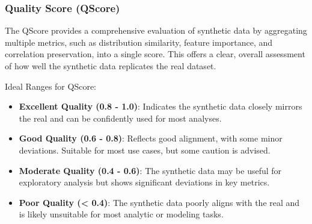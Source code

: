 \documentclass[
  letterpaper,
  DIV=11,
  numbers=noendperiod]{scrartcl}
\providecommand{\tightlist}{%
  \setlength{\itemsep}{0pt}\setlength{\parskip}{0pt}}\usepackage{longtable,booktabs,array}
\begin{document}
\subsubsection{Quality Score (QScore)}\label{quality-score-qscore}

The QScore provides a comprehensive evaluation of synthetic data by
aggregating multiple metrics, such as distribution similarity, feature
importance, and correlation preservation, into a single score. This
offers a clear, overall assessment of how well the synthetic data
replicates the real dataset.

Ideal Ranges for QScore:

\begin{itemize}
\tightlist
\item
  \textbf{Excellent Quality (0.8 - 1.0)}: Indicates the synthetic data
  closely mirrors the real and can be confidently used for most
  analyses.
\item
  \textbf{Good Quality (0.6 - 0.8)}: Reflects good alignment, with some
  minor deviations. Suitable for most use cases, but some caution is
  advised.
\item
  \textbf{Moderate Quality (0.4 - 0.6)}: The synthetic data may be
  useful for exploratory analysis but shows significant deviations in
  key metrics.
\item
  \textbf{Poor Quality (\textless{} 0.4)}: The synthetic data poorly
  aligns with the real and is likely unsuitable for most analytic or
  modeling tasks.
\end{itemize}
\end{document}
